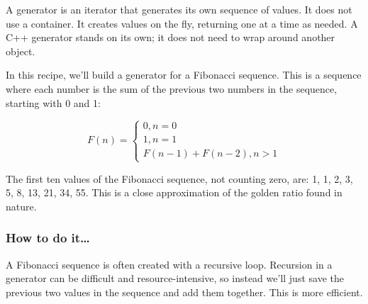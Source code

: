 
A generator is an iterator that generates its own sequence of values. It does not use a container. It creates values on the fly, returning one at a time as needed. A C++ generator stands on its own; it does not need to wrap around another object.

In this recipe, we'll build a generator for a Fibonacci sequence. This is a sequence where each number is the sum of the previous two numbers in the sequence, starting with 0 and 1:

\begin{equation*}
F(n)=
\begin{cases}
	0, n = 0 \\
	1, n = 1 \\
	F(n-1) + F(n-2), n > 1
\end{cases}
\end{equation*}

The first ten values of the Fibonacci sequence, not counting zero, are: 1, 1, 2, 3, 5, 8, 13, 21, 34, 55. This is a close approximation of the golden ratio found in nature.

\subsubsection{How to do it…}

A Fibonacci sequence is often created with a recursive loop. Recursion in a generator can be difficult and resource-intensive, so instead we'll just save the previous two values in the sequence and add them together. This is more efficient.

